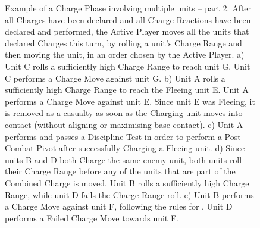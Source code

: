 \newcommand{\figEOCPtA}{a)}
\newcommand{\figEOCPtB}{b)}
\newcommand{\figEOCPtC}{c)}
\newcommand{\figEOCPtD}{d)}
\newcommand{\figEOCPtE}{e)}
\newcommand{\figEOCPtcharge}{\smallfontsize\flufffont{Charge}}
\newcommand{\figEOCPtChargeRangeRoll}{\normalfontsize Charge Range roll}
\newcommand{\figEOCPtDisciplineTest}{\normalfontsize Discipline Test}
\newcommand{\figEOCPtPassed}{\normalfontsize Passed}
\newcommand{\figEOCPtFailed}{\normalfontsize Failed}

\begin{figure}[!htbp]
	\begin{minipage}{0.41\textwidth}
	\caption{Example of a Charge Phase involving multiple units -- part 2.\captionpar
	After all Charges have been declared and all Charge Reactions have been declared and performed, the Active Player moves all the units that declared Charges this turn, by rolling a unit's Charge Range and then moving the unit, in an order chosen by the Active Player.\captionpar
	a) Unit C rolls a sufficiently high Charge Range to reach unit G. Unit C performs a Charge Move against unit G.\captionpar
	b) Unit A rolls a sufficiently high Charge Range to reach the Fleeing unit E. Unit A performs a Charge Move against unit E. Since unit E was Fleeing, it is removed as a casualty as soon as the Charging unit moves into contact (without aligning or maximising base contact).\captionpar
	c) Unit A performs and passes a Discipline Test in order to perform a Post-Combat Pivot after successfully Charging a Fleeing unit.\captionpar
	d) Since units B and D both Charge the same enemy unit, both units roll their Charge Range before any of the units that are part of the Combined Charge is moved. Unit B rolls a sufficiently high Charge Range, while unit D fails the Charge Range roll.\captionpar
	e) Unit B performs a Charge Move against unit F, following the rules for . Unit D performs a Failed Charge Move towards unit F.%
	}
	\label{figure/example_of_charge_phase_two}
	\end{minipage}\hfill\begin{minipage}{0.57\textwidth}
	\renewcommand{\figbiglettersize}{12}
	\def\svgwidth{\textwidth}
	
	\end{minipage}
\end{figure}
